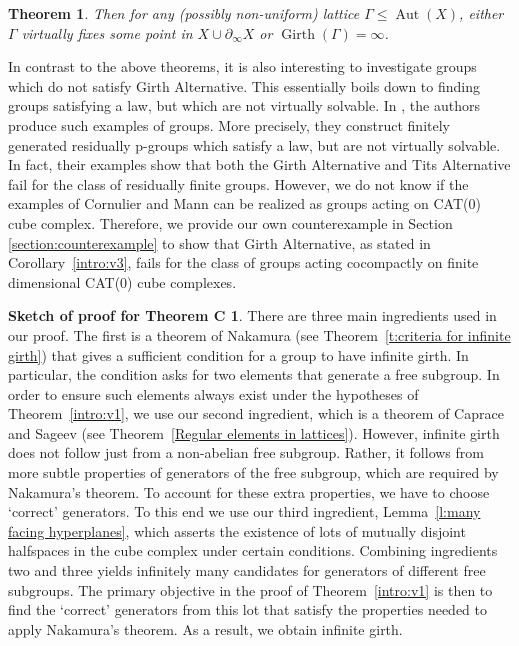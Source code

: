 \documentclass{amsart}
\theoremstyle{definition}
\newtheorem*{Notation warning}{Warning on notations}
\newtheorem*{Sketch of proof}{Sketch of proof for Theorem C}
\newtheorem{thmintro}{Theorem}
\newcommand{\bdry}{\partial_\infty}
\DeclareMathOperator{\Gir}{Girth}
\def\aut{\mathop{\mathrm{Aut}}\nolimits}
\begin{document}
\begin{sloppypar}
\begin{thmintro}
\emph{Then for any (possibly non-uniform) lattice $\Gamma \leq \aut(X)$, 
either $\Gamma$ virtually fixes some point in $X\cup \bdry X$ or 
$\Gir(\Gamma)=\infty$.}
\end{thmintro}

In contrast to the above theorems, it is also interesting to investigate groups which do not satisfy Girth Alternative. This essentially boils down to finding groups satisfying a law, but which are not virtually solvable. 
In \cite{Cornulier_Mann}, the authors produce such examples of groups. More precisely, they construct finitely generated residually p-groups which satisfy a law, but are not virtually solvable. In fact, their examples show that both the Girth Alternative and Tits Alternative fail for the class of residually finite groups. However, we do not know if the examples of Cornulier and Mann can be realized as groups acting on CAT(0) cube complex. Therefore, we provide our own counterexample in Section \ref{section:counterexample} to show that Girth Alternative, as stated in Corollary~\ref{intro:v3}, fails for the class of groups acting cocompactly on finite dimensional CAT(0) cube complexes.

\medskip

\begin{Sketch of proof} 
There are three main ingredients used in our proof. The first is a theorem of Nakamura \cite{nakamura2011girth} (see Theorem~\ref{t:criteria for infinite girth}) that gives a sufficient condition for a group to have infinite girth.
In particular, the condition asks for two elements that generate a free subgroup. 
In order to ensure such elements always exist under the hypotheses of Theorem~\ref{intro:v1}, we use our second ingredient, which is a theorem of Caprace and Sageev \cite{Caprace_2011} (see Theorem~\ref{Regular elements in lattices}).
However, infinite girth does not follow just from a non-abelian free subgroup. 
Rather, it follows from more subtle properties of generators of the free subgroup, which are required by Nakamura's theorem.
To account for these extra properties, we have to choose `correct' generators.
To this end we use our third ingredient, Lemma~\ref{l:many facing hyperplanes}, which asserts the existence of lots of mutually disjoint halfspaces in the cube complex under certain conditions.
Combining ingredients two and three yields infinitely many candidates for generators of different free subgroups.
 The primary objective in the proof of Theorem~\ref{intro:v1} is then to find the `correct' generators from this lot that satisfy the properties needed to apply Nakamura's theorem.
As a result, we obtain infinite girth.
\end{Sketch of proof}




\end{sloppypar}
\end{document}
